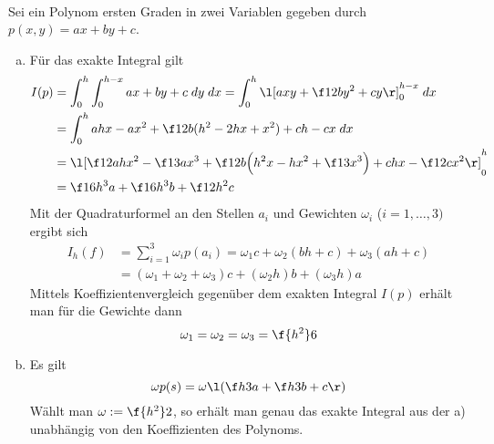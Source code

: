 \documentclass[a4paper]{scrartcl}
\begin{document}
\begin{aufgabe}~

	Sei ein Polynom ersten Graden in zwei Variablen gegeben durch $p(x,y) = ax + by + c$.
	\begin{enumerate}[a)]
		\item
			Für das exakte Integral gilt
			\begin{align*}
				I(p) 
				&= \int_0^h \int_0^{h-x} ax + by +c \; dy\;dx 
				= \int_0^h \l[axy + \f 12 by^2 + cy\r]_0^{h-x} \;dx \\
				&= \int_0^h ahx -ax^2 + \f 12b ( h^2-2hx + x^2) + ch -cx \;dx \\
				&= \l[\f 12 ahx^2 - \f 13ax^3 + \f 12 b\Big(h^2x-hx^2 + \f 13 x^3\Big) + chx - \f 12 cx^2 \r]_0^h \\
				&= \f 16 h^3 a + \f 16 h^3 b + \f 12 h^2 c
			\end{align*}
			Mit der Quadraturformel an den Stellen $a_i$ und Gewichten $\omega_i$ ($i=1,\dotsc,3)$ ergibt sich
			\begin{align*}
				I_h(f) 
				&= \sum_{i=1}^3 \omega_i p(a_i) 
				= \omega_1 c + \omega_2(bh+c) + \omega_3(ah +c) \\
				&= (\omega_1 + \omega_2 + \omega_3)c + (\omega_2 h)b + (\omega_3 h) a
			\end{align*}
			Mittels Koeffizientenvergleich gegenüber dem exakten Integral $I(p)$ erhält man für die Gewichte dann
			\[
				\omega_1 = \omega_2 = \omega_3 = \f {h^2}6
			\]
		\item
			Es gilt
			\[
				\omega p(s) = \omega\l( \f h3 a + \f h3 b + c \r)
			\]
			Wählt man $\omega := \f {h^2}2$, so erhält man genau das exakte Integral aus der a) unabhängig von den Koeffizienten des Polynoms.
	\end{enumerate}
\end{aufgabe}
\end{document}
